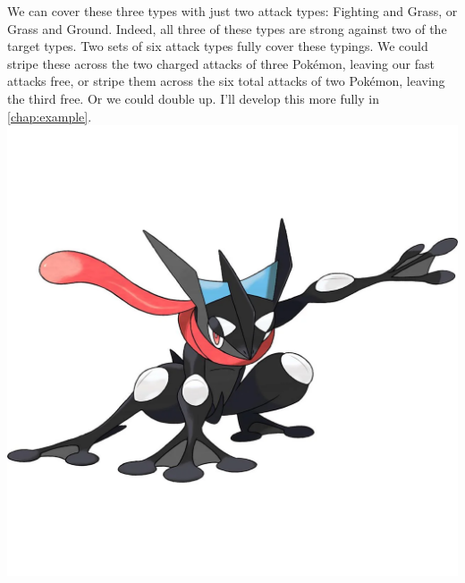 We can cover these three types with just two attack types: Fighting and Grass, or Grass and Ground.
Indeed, all three of these types are strong against two of the target types.
Two sets of six attack types fully cover these typings.
We could stripe these across the two charged attacks of three Pokémon,
  leaving our fast attacks free, or stripe them across the six total
  attacks of two Pokémon, leaving the third free.
Or we could double up.
I'll develop this more fully in \autoref{chap:example}.
\vfill
\includegraphics[width=\linewidth,keepaspectratio]{images/greninja.png}
